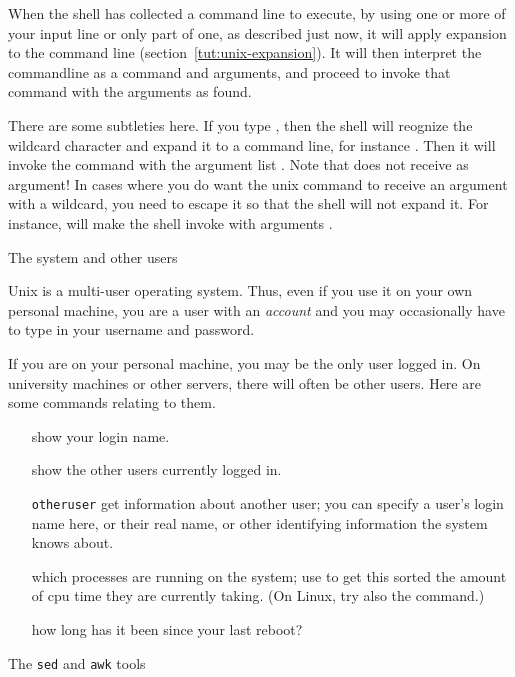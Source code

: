 When the shell has collected a command line to execute, by using one or
more of your input line or only part of one, as described just now, it
will apply expansion to the command line
(section~\ref{tut:unix-expansion}). It will then interpret the
commandline as a command and arguments, and proceed to invoke that
command with the arguments as found.

There are some subtleties here. If you type , then the shell
will reognize the wildcard character and expand it to a command line,
for instance . Then it will invoke the 
command with the argument list . Note that  does
not receive  as argument! In cases where you do want the unix
command to receive an argument with a wildcard, you need to escape it
so that the shell will not expand it. For instance,  will make the shell invoke  with arguments .

 {The system and other users}
\label{sec:users}

Unix is a multi-user operating system. Thus, even if you use it
on your own personal machine, you are a user with an \emph{account}
and you may occasionally
have to type in your username and password.

If you are on your personal machine, you may be the only user logged
in. On university machines or other servers, there will often be other
users. Here are some commands relating to them.

\begin{itemize}
\item [\indextermunix{whoami}] show your login name.
\item [\indextermunix{who}] show the other users currently logged in.
\item [\indextermunix{finger} {\tt otheruser}] get information about another user;
  you can specify a user's login name here, or their real name,
  or other identifying information the system knows about.
\item [\indextermunix{top}] which processes are running on the system; use
   to get this sorted the amount of cpu time they are
  currently taking. (On Linux, try also the  command.)
\item [\indextermunix{uptime}] how long has it been since your last reboot?
\end{itemize}

 {The {\tt sed} and {\tt awk} tools}


